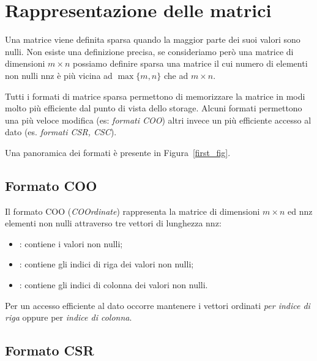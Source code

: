 \section{Rappresentazione delle matrici}\label{rappresentazione}

Una matrice viene definita sparsa quando la maggior parte dei suoi valori sono nulli. Non esiste una definizione precisa, se consideriamo però una matrice di dimensioni $m \times n$ possiamo definire sparsa una matrice il cui numero di elementi non nulli $\mathrm{nnz}$ è più vicina ad $\max\{m, n \}$ che ad $m \times n$. 

Tutti i formati di matrice sparsa permettono di memorizzare la matrice in modi molto più efficiente dal punto di vista dello storage. Alcuni formati permettono una più veloce modifica (es: \emph{formati COO}) altri invece un più efficiente accesso al dato (es. \emph{formati CSR, CSC}). 

Una panoramica dei formati è presente in Figura~\ref{first_fig}.

\subsection{Formato COO}

Il formato COO (\emph{COOrdinate}) rappresenta la matrice di dimensioni $m \times n$ ed $\mathrm{nnz}$ elementi non nulli attraverso tre vettori di lunghezza $\mathrm{nnz}$:
\begin{itemize}
    \item {}: contiene i valori non nulli;
    \item {}: contiene gli indici di riga dei valori non nulli;
    \item {}: contiene gli indici di colonna dei valori non nulli.
\end{itemize}

Per un accesso efficiente al dato occorre mantenere i vettori ordinati \emph{per indice di riga} oppure per \emph{indice di colonna}. 

\subsection{Formato CSR}\label{csr}

